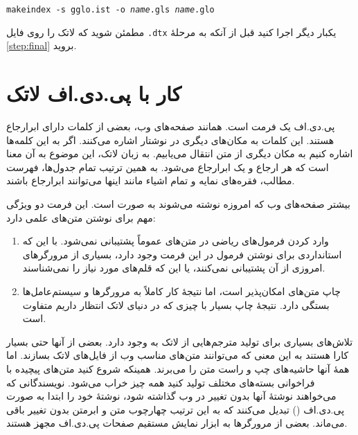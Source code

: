 \noindent
\setLR

\texttt{makeindex -s gglo.ist -o \textit{name}.gls \textit{name}.glo}

\setRL

\noindent مطمئن شوید که لاتک را روی فایل \texttt{.dtx} یکبار دیگر اجرا کنید قبل از آنکه به مرحلهٔ 
\ref{step:final} بروید.



\section{کار با پی.دی.اف لاتک}\label{sec:pdftex}
پی.دی.اف یک فرمت 
%
 است. همانند صفحه‌های وب، بعضی از کلمات دارای ابرارجاع هستند. این کلمات به مکان‌های دیگری در نوشتار‌ اشاره می‌کنند. اگر به این کلمه‌ها اشاره کنیم به مکان دیگری از متن انتقال می‌یابیم. به زبان لاتک، این موضوع به آن معنا است که هر ارجاع   و  یک ابرارجاع می‌شود. به همین ترتیب تمام جدول‌ها، فهرست مطالب، فقره‌های نمایه و تمام اشیاء مانند اینها می‌توانند ابرارجاع باشند.

بیشتر صفحه‌های وب که امروزه نوشته می‌شوند به صورت  است. این فرمت دو ویژگی مهم برای نوشتن متن‌های علمی دارد:
\begin{enumerate}
\item وارد کردن فرمول‌های ریاضی در متن‌های  عموماً پشتیبانی نمی‌شود. با این که استانداردی برای نوشتن فرمول در این فرمت وجود دارد، بسیاری از مرورگرهای امروزی از آن پشتیبانی نمی‌کنند، یا این که قلم‌های مورد نیاز را نمی‌شناسند.
\item چاپ متن‌های  امکان‌پذیر است، اما نتیجهٔ کار کاملاً به مرورگرها و سیستم‌عامل‌ها بستگی دارد. نتیجهٔ چاپ بسیار با چیزی که در دنیای لاتک انتظار داریم متفاوت است.
\end{enumerate}

تلاش‌های بسیاری برای تولید مترجم‌هایی از لاتک به  وجود دارد. بعضی از آنها حتی بسیار کارا هستند به این معنی که می‌توانند متن‌های مناسب وب از فایل‌های لاتک بسازند. اما همهٔ آنها حاشیه‌های چپ و راست متن را می‌برند. همینکه شروع کنید متن‌های پیچیده با فراخوانی بسته‌های مختلف تولید کنید همه چیز خراب می‌شود. نویسندگانی که می‌خواهند نوشتهٔ آنها بدون تغییر در وب گذاشته شود، نوشتهٔ خود را ابتدا به صورت پی.دی.اف () تبدیل می‌کنند که به این ترتیب چهارچوب متن و ابرمتن بدون تغییر باقی می‌ماند. بعضی از مرورگرها به ابزار نمایش مستقیم صفحات پی.دی.اف مجهز هستند.


